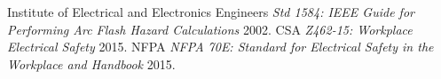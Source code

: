 
\begin{thebibliography}{1}

 Institute of Electrical and Electronics Engineers {\em Std 1584: IEEE Guide for Performing Arc Flash Hazard Calculations}  2002.
 CSA {\em Z462-15: Workplace Electrical Safety}  2015.
 NFPA {\em NFPA 70E: Standard for Electrical Safety in the Workplace and Handbook}  2015.

\end{thebibliography}